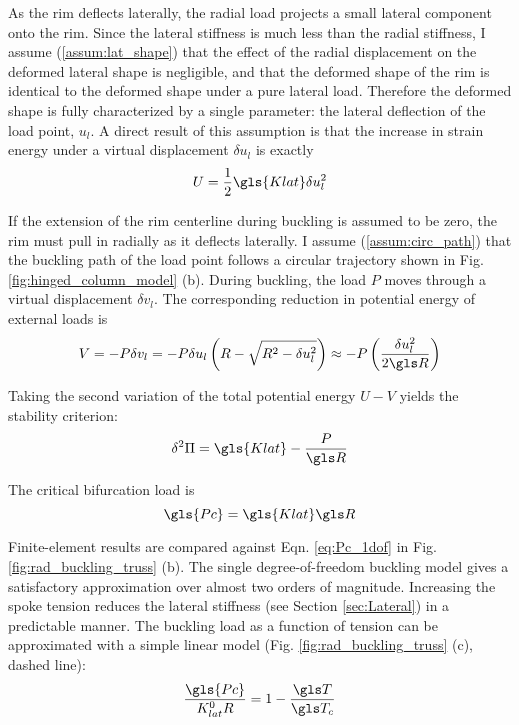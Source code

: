 \documentclass[\rootdir/thesis.tex]{subfiles}
\begin{document}
As the rim deflects laterally, the radial load projects a small lateral component onto the rim. Since the lateral stiffness is much less than the radial stiffness, I assume (\ref{assum:lat_shape}) that the effect of the radial displacement on the deformed lateral shape is negligible, and that the deformed shape of the rim is identical to the deformed shape under a pure lateral load. Therefore the deformed shape is fully characterized by a single parameter: the lateral deflection of the load point, $u_l$. A direct result of this assumption is that the increase in strain energy under a virtual displacement $\delta u_l$ is exactly
\begin{equation}
\label{eq:U_rim_1dof}
U = \frac{1}{2} \gls{Klat} \delta u_l^2
\end{equation}

If the extension of the rim centerline during buckling is assumed to be zero, the rim must pull in radially as it deflects laterally. I assume (\ref{assum:circ_path}) that the buckling path of the load point follows a circular trajectory shown in Fig. \ref{fig:hinged_column_model} (b). During buckling, the load $P$ moves through a virtual displacement $\delta v_l$. The corresponding reduction in potential energy of external loads is
\begin{equation}
\label{eq:V_rim_1dof}
V = -P\delta v_l = -P \delta u_l \left(\\R - \sqrt{R^2 - \delta u_l^2}\right)
\approx -P \left(\frac{\delta u_l^2}{2\R}\right)
\end{equation}

Taking the second variation of the total potential energy $U-V$ yields the stability criterion:
\begin{equation}
\label{eq:ddPi_1dof}
\delta^2 \Pi = \gls{Klat} - \frac{P}{\R}
\end{equation}

The critical bifurcation load is
\begin{equation}
\label{eq:Pc_1dof}
\gls{Pc} = \gls{Klat}\R
\end{equation}

Finite-element results are compared against Eqn. \eqref{eq:Pc_1dof} in Fig. \ref{fig:rad_buckling_truss} (b). The single degree-of-freedom buckling model gives a satisfactory approximation over almost two orders of magnitude. Increasing the spoke tension reduces the lateral stiffness (see Section \ref{sec:Lateral}) in a predictable manner. The buckling load as a function of tension can be approximated with a simple linear model (Fig. \ref{fig:rad_buckling_truss} (c), dashed line):
\begin{equation}
\label{eq:P_c_T}
\frac{\gls{Pc}}{K_{lat}^0 R} = 1 - \frac{\T}{\T_c}
\end{equation}
\end{document}
